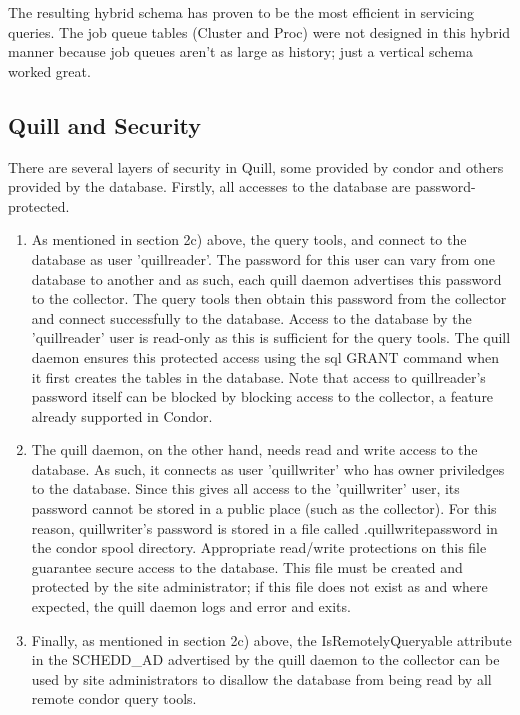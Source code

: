 The resulting hybrid schema has proven to be the most efficient in
servicing  queries.  The job queue tables (Cluster and
Proc) were not designed in this hybrid manner because job queues aren't
as large as history; just a vertical schema worked great.


\subsection{\label{sec:Quill-Security}Quill and Security}

There are several layers of security in Quill, some provided by condor and
others provided by the database.  Firstly, all accesses to the database
are password-protected.

\begin{enumerate}
\item As mentioned in section 2c) above, the query tools, 
and  connect to the database as user 'quillreader'.
The password for this user can vary from one database to another and
as such, each quill daemon advertises this password to the collector.
The query tools then obtain this password from the collector and connect
successfully to the database.  Access to the database by the 'quillreader'
user is read-only as this is sufficient for the query tools.  The quill
daemon ensures this protected access using the sql GRANT command when
it first creates the tables in the database.  Note that access to
quillreader's password itself can be blocked by blocking access to the
collector, a feature already supported in Condor.

\item The quill daemon, on the other hand, needs read and write access
to the database.  As such, it connects as user 'quillwriter' who has
owner priviledges to the database.  Since this gives all access to the
'quillwriter' user, its password cannot be stored in a public place
(such as the collector).  For this reason, quillwriter's password is
stored in a file called .quillwritepassword in the condor spool directory.
Appropriate read/write protections on this file guarantee secure access
to the database.  This file must be created and protected by the site
administrator;  if this file does not exist as and where expected,
the quill daemon logs and error and exits.

\item Finally, as mentioned in section 2c) above, the IsRemotelyQueryable
attribute in the SCHEDD\_AD advertised by the quill daemon to the collector
can be used by site administrators to disallow the database from being
read by all remote condor query tools.

\end{enumerate}

